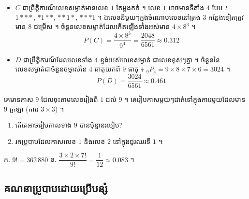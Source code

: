\begin{example}[លំហាត់គំរូ ២]
\begin{enumerate}[a]
\begin{itemize}
    \[
    P(B) = \frac{256}{6561} \approx 0.039
    \]
    \item $C$ ជាព្រឹត្តិការណ៍លេខសម្ងាត់មានលេខ $1$ តែម្ដងគត់ ។ លេខ $1$ អាចមានទីតាំង $4$ បែប ៖ $1{*}{*}{*}$, ${*}1{*}{*}$, ${*}{*}1{*}$, ${*}{*}{*}1$ ។ ឯលេខនីមួយៗក្នុងចំណោមលេខនៅត្រង់ $3$ កន្លែងទៀតត្រូវមាន $8$ ជម្រើស ។ ចំនួនលេខសម្ងាត់ដែលកើតឡើងទាំងអស់មាន $4\times 8^3$ ។
    \[
    P(C) = \frac{4\times 8^3}{9^4} = \frac{2048}{6561} \approx 0.312
    \]
    \item $D$ ជាព្រឹត្តិការណ៍ដែលលេខទាំង $4$ ខ្ទង់របស់លេខសម្ងាត់ ជាលេខខុសៗគ្នា ។ ចំនួននៃលេខសម្ងាត់ជាចំនួនចម្លាស់នៃ $4$ ធាតុយកពី $9$ ធាតុ ៖ ${}_9P_4 = 9\times 8\times 7\times 6 = 3024$ ។
    \[
    P(D) = \frac{3024}{6561} \approx 0.461
    \]
  \end{itemize}
\end{enumerate}
\end{example}

\begin{pro}
គេមានកាស $9$ ដែលចុះតាមលេខរៀងពី $1$ ដល់ $9$ ។ គេរៀបកាសមួយៗដាក់ទៅក្នុងការេមួយដែលមាន $9$ ក្រឡា (ការេ $3\times 3$) ។
\begin{center}
\end{center}
\begin{enumerate}[a]
  \item តើគេអាចរៀបកាសទាំង $9$ បានប៉ុន្មានរបៀប?
  \item រកប្រូបាបដែលកាសលេខ $1$ និងលេខ $2$ នៅក្នុងជួរឈរទី $1$ ។
\end{enumerate}
\ans
ក. $9! = 362\,880$ \quad ខ. $\dfrac{3\times 2\times 7!}{9!} = \dfrac{1}{12} \approx 0.083$ ។
\end{pro}

\subsection{គណនាប្រូបាបដោយប្រើបន្សំ}

